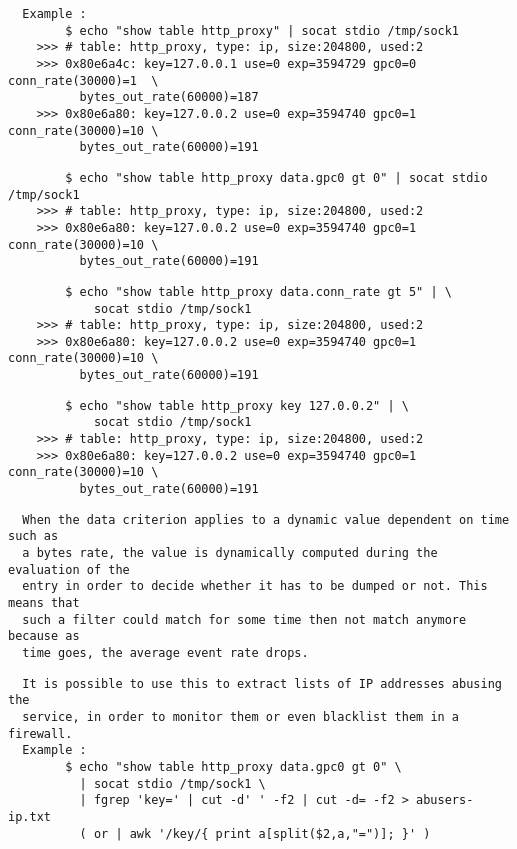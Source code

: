\begin{verbatim}
  Example :
        $ echo "show table http_proxy" | socat stdio /tmp/sock1
    >>> # table: http_proxy, type: ip, size:204800, used:2
    >>> 0x80e6a4c: key=127.0.0.1 use=0 exp=3594729 gpc0=0 conn_rate(30000)=1  \
          bytes_out_rate(60000)=187
    >>> 0x80e6a80: key=127.0.0.2 use=0 exp=3594740 gpc0=1 conn_rate(30000)=10 \
          bytes_out_rate(60000)=191
\end{verbatim}

\begin{verbatim}
        $ echo "show table http_proxy data.gpc0 gt 0" | socat stdio /tmp/sock1
    >>> # table: http_proxy, type: ip, size:204800, used:2
    >>> 0x80e6a80: key=127.0.0.2 use=0 exp=3594740 gpc0=1 conn_rate(30000)=10 \
          bytes_out_rate(60000)=191
\end{verbatim}

\begin{verbatim}
        $ echo "show table http_proxy data.conn_rate gt 5" | \
            socat stdio /tmp/sock1
    >>> # table: http_proxy, type: ip, size:204800, used:2
    >>> 0x80e6a80: key=127.0.0.2 use=0 exp=3594740 gpc0=1 conn_rate(30000)=10 \
          bytes_out_rate(60000)=191
\end{verbatim}

\begin{verbatim}
        $ echo "show table http_proxy key 127.0.0.2" | \
            socat stdio /tmp/sock1
    >>> # table: http_proxy, type: ip, size:204800, used:2
    >>> 0x80e6a80: key=127.0.0.2 use=0 exp=3594740 gpc0=1 conn_rate(30000)=10 \
          bytes_out_rate(60000)=191
\end{verbatim}

\begin{verbatim}
  When the data criterion applies to a dynamic value dependent on time such as
  a bytes rate, the value is dynamically computed during the evaluation of the
  entry in order to decide whether it has to be dumped or not. This means that
  such a filter could match for some time then not match anymore because as
  time goes, the average event rate drops.
\end{verbatim}

\begin{verbatim}
  It is possible to use this to extract lists of IP addresses abusing the
  service, in order to monitor them or even blacklist them in a firewall.
  Example :
        $ echo "show table http_proxy data.gpc0 gt 0" \
          | socat stdio /tmp/sock1 \
          | fgrep 'key=' | cut -d' ' -f2 | cut -d= -f2 > abusers-ip.txt
          ( or | awk '/key/{ print a[split($2,a,"=")]; }' )
\end{verbatim}

